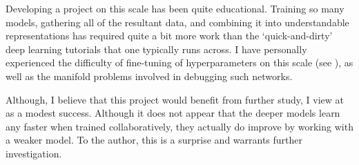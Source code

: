 \documentclass[english,a4paper,oneside]{amsart}
\theoremstyle{definition}
\begin{document}
Developing a project on this scale has been quite educational. Training so many models, gathering all of the resultant data, and combining it into understandable representations has required quite a bit more work than the `quick-and-dirty' deep learning tutorials that one typically runs across. I have personally experienced the difficulty of fine-tuning of hyperparameters on this scale (see ), as well as the manifold problems involved in debugging such networks. 

Although, I believe that this project would benefit from further study, I view at as a modest success. Although it does not appear that the deeper models learn any faster when trained collaboratively, they actually do improve by working with a weaker model. To the author, this is a surprise and warrants further investigation.

\end{document}
